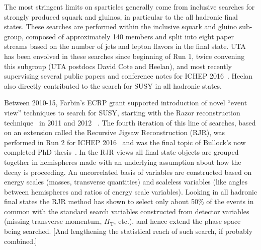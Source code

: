 
The most stringent limits on sparticles generally come from inclusive
searches for strongly produced squark and gluinos, in particular to
the all hadronic final states. These searches are performed within the
inclusive squark and gluino sub-group, composed of approximately 140
members and split into eight paper streams based on the number of jets
and lepton flavors in the final state.  UTA has been envolved in these
searches since beginning of Run 1, twice convening this subgroup (UTA
postdocs David Cote and Heelan), and most recently supervising several
public papers and conference notes for ICHEP
2016~\cite{Aad:2016jxj,Aaboud:2016zdn,Aad:2016qqk,ATLAS-CONF-2015-082,Aad:2016tuk,Aad:2016eki,Aaboud:2016zpr,ATLASCollaboration:2016wlb,ATLAS-CONF-2016-078,ATLAS-CONF-2016-054,ATLAS-CONF-2016-037,ATLAS-CONF-2016-052,ATLAS-CONF-2016-066,ATLAS-CONF-2016-095}. Heelan
also directly contributed to the search for SUSY in all hadronic
states.



Between 2010-15, Farbin's ECRP grant supported introduction of novel
``event view'' techniques to search for SUSY, starting with the Razor
reconstruction technique~\cite{Rogan:2010kb} in 2011\cite{Aad:2012naa}
and 2012 ~\cite{Aad:2015iea}. The fourth iteration of this line of
searches, based on an extension called the Recursive Jigsaw
Reconstruction (RJR), was performed in Run 2 for ICHEP
2016~\cite{ATLAS-CONF-2016-078} and was the final topic of Bullock's
now completed PhD thesis~\cite{}. In the RJR views all final state
objects are grouped together in hemispheres made with an underlying
assumption about how the decay is proceeding. An uncorrelated basis of
variables are constructed based on energy scales (masses, transverse
quantities) and scaleless variables (like angles between hemispheres
and ratios of energy scale variables). Looking in all hadronic final
states the RJR method has shown to select only about 50\% of the
events in common with the standard search variables constructed from
detector variables (missing transverse momentum, $H_\mathrm{T}$,
etc.), and hence extend the phase space being searched. [And
  lengthening the statistical reach of such search, if probably
  combined.]


